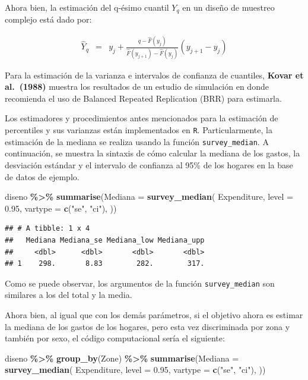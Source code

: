\documentclass[
  spanish,
  12pt,
]{book}
\newenvironment{Shaded}{\begin{snugshade}}{\end{snugshade}}
\newcommand{\AttributeTok}[1]{\textcolor[rgb]{0.13,0.29,0.53}{#1}}
\newcommand{\FloatTok}[1]{\textcolor[rgb]{0.00,0.00,0.81}{#1}}
\newcommand{\FunctionTok}[1]{\textcolor[rgb]{0.13,0.29,0.53}{\textbf{#1}}}
\newcommand{\NormalTok}[1]{#1}
\newcommand{\SpecialCharTok}[1]{\textcolor[rgb]{0.81,0.36,0.00}{\textbf{#1}}}
\newcommand{\StringTok}[1]{\textcolor[rgb]{0.31,0.60,0.02}{#1}}
\begin{document}
Ahora bien, la estimación del q-ésimo cuantil \(Y_{q}\) en un diseño de muestreo complejo está dado por:

\begin{eqnarray*}
\hat{Y}_{q} & = & y_{j}+\frac{q-\hat{F}\left(y_{j}\right)}{\hat{F}\left(y_{j+1}\right)-\hat{F}\left(y_{j}\right)}\left(y_{j+1}-y_{j}\right)
\end{eqnarray*}

Para la estimación de la varianza e intervalos de confianza de cuantiles, \textbf{Kovar et al.~(1988)} muestra los resultados de un estudio de simulación en donde recomienda el uso de Balanced Repeated Replication (BRR) para estimarla.

Los estimadores y procedimientos antes mencionados para la estimación de percentiles y sus varianzas están implementados en \texttt{R}. Particularmente, la estimación de la mediana se realiza usando la función \texttt{survey\_median}. A continuación, se muestra la sintaxis de cómo calcular la mediana de los gastos, la desviación estándar y el intervalo de confianza al 95\% de los hogares en la base de datos de ejemplo.

\begin{Shaded}
\begin{Highlighting}[]
\NormalTok{diseno }\SpecialCharTok{\%\textgreater{}\%} \FunctionTok{summarise}\NormalTok{(}\AttributeTok{Mediana =}
  \FunctionTok{survey\_median}\NormalTok{(}
\NormalTok{    Expenditure,}
    \AttributeTok{level =} \FloatTok{0.95}\NormalTok{,}
    \AttributeTok{vartype =}  \FunctionTok{c}\NormalTok{(}\StringTok{"se"}\NormalTok{, }\StringTok{"ci"}\NormalTok{),}
\NormalTok{   ))}
\end{Highlighting}
\end{Shaded}

\begin{verbatim}
## # A tibble: 1 x 4
##   Mediana Mediana_se Mediana_low Mediana_upp
##     <dbl>      <dbl>       <dbl>       <dbl>
## 1    298.       8.83        282.        317.
\end{verbatim}

Como se puede observar, los argumentos de la función \texttt{survey\_median} son similares a los del total y la media.

Ahora bien, al igual que con los demás parámetros, si el objetivo ahora es estimar la mediana de los gastos de los hogares, pero esta vez discriminada por zona y también por sexo, el código computacional sería el siguiente:

\begin{Shaded}
\begin{Highlighting}[]
\NormalTok{diseno }\SpecialCharTok{\%\textgreater{}\%} \FunctionTok{group\_by}\NormalTok{(Zone) }\SpecialCharTok{\%\textgreater{}\%}
  \FunctionTok{summarise}\NormalTok{(}\AttributeTok{Mediana =}
  \FunctionTok{survey\_median}\NormalTok{(}
\NormalTok{    Expenditure,}
    \AttributeTok{level =} \FloatTok{0.95}\NormalTok{,}
    \AttributeTok{vartype =}  \FunctionTok{c}\NormalTok{(}\StringTok{"se"}\NormalTok{, }\StringTok{"ci"}\NormalTok{),}
\NormalTok{   ))}
\end{Highlighting}
\end{Shaded}
\end{document}
